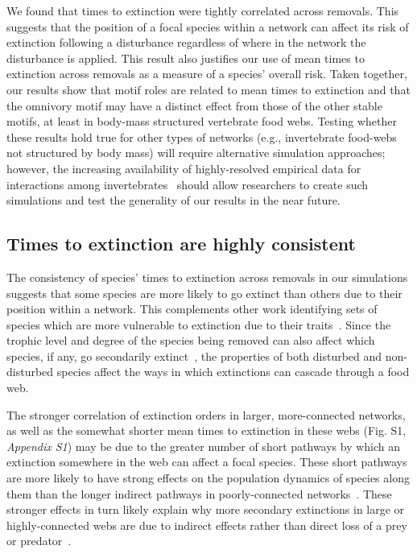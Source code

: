 \documentclass[12pt]{article}
\begin{document}
\begin{spacing}{2.0}
    We found that times to extinction were tightly correlated across removals. 
    This suggests that the position of a focal species within a network can affect its risk of extinction following a disturbance regardless of where in the network the disturbance is applied. This result also justifies our use of mean times to extinction across removals as a measure of a species' overall risk.
    Taken together, our results show that motif roles are related to mean times to extinction and that the omnivory motif may have a distinct effect from those of the other stable motifs, at least in body-mass structured vertebrate food webs.
    Testing whether these results hold true for other types of networks (e.g., invertebrate food-webs not structured by body mass) will require alternative simulation approaches; however, the increasing availability of highly-resolved empirical data for interactions among invertebrates~\citep{} should allow researchers to create such simulations and test the generality of our results in the near future.


 	\subsection*{Times to extinction are highly consistent}

		The consistency of species' times to extinction across removals in our simulations suggests that some species are more likely to go extinct than others due to their position within a network.
        This complements other work identifying sets of species which are more vulnerable to extinction due to their traits~\citep{Curtsdotter2011,Ryser2019}. 
		Since the trophic level and degree of the species being removed can also affect which species, if any, go secondarily extinct~\citep{Wootton2016a,Dunne2002}, the properties of both disturbed and non-disturbed species affect the ways in which extinctions can cascade through a food web.
		
		
		The stronger correlation of extinction orders in larger, more-connected networks, as well as the somewhat shorter mean times to extinction in these webs (Fig. S1, \emph{Appendix S1}) may be due to the greater number of short pathways by which an extinction somewhere in the web can affect a focal species. 
		These short pathways are more likely to have strong effects on the population dynamics of species along them than the longer indirect pathways in poorly-connected networks~\citep{Jordan2002,Jordan2006}.
		These stronger effects in turn likely explain why more secondary extinctions in large or highly-connected webs are due to indirect effects rather than direct loss of a prey or predator~\citet{Wootton2016a}. 



\end{spacing}
\end{document}
